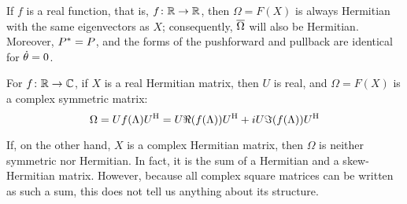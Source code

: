 \documentclass[../main.tex]{subfiles}
\begin{document}
\begin{refsection}
If $f$ is a real function, that is, $f \colon \mathbb{R} \to \mathbb{R}$, then $\Omega = F(X)$ is always Hermitian with the same eigenvectors as $X$; consequently, $\overline{\Omega}$ will also be Hermitian.
Moreover, ${P}^* = P$, and the forms of the pushforward and pullback are identical for $\dot{\theta}=0$.

For $f \colon \mathbb{R} \to \mathbb{C}$, if $X$ is a real Hermitian matrix, then $U$ is real, and $\Omega = F(X)$ is a complex symmetric matrix:
\[\Omega = U f(\Lambda) {U}^\mathrm{H} = U \Re(f(\Lambda)) {U}^\mathrm{H} + i U \Im(f(\Lambda)) {U}^\mathrm{H}\]

If, on the other hand, $X$ is a complex Hermitian matrix, then $\Omega$ is neither symmetric nor Hermitian.
In fact, it is the sum of a Hermitian and a skew-Hermitian matrix.
However, because all complex square matrices can be written as such a sum, this does not tell us anything about its structure.

\printbibliography[heading=subbibintoc]
\end{refsection}
\end{document}
